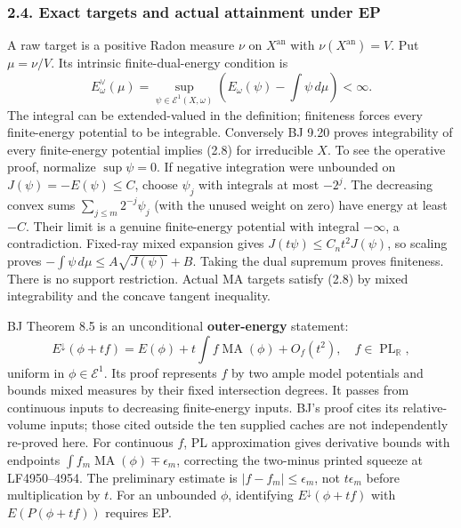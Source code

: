 \documentclass[
  10pt,
]{article}
\begin{document}
\subsubsection{2.4. Exact targets and actual attainment under
EP}\label{exact-targets-and-actual-attainment-under-ep}

A raw target is a positive Radon measure \(\nu\) on \(X^{\mathrm{an}}\)
with \(\nu(X^{\mathrm{an}})=V\). Put \(\mu=\nu/V\). Its intrinsic
finite-dual-energy condition is \[
 E_\omega^\vee(\mu)=\sup_{\psi\in\mathcal E^1(X,\omega)}
 \left(E_\omega(\psi)-\int\psi\,d\mu\right)<\infty. \tag{2.8}
\] The integral can be extended-valued in the definition; finiteness
forces every finite-energy potential to be integrable. Conversely BJ
9.20 proves integrability of every finite-energy potential implies (2.8)
for irreducible \(X\). To see the operative proof, normalize
\(\sup\psi=0\). If negative integration were unbounded on
\(J(\psi)=-E(\psi)\le C\), choose \(\psi_j\) with integrals at most
\(-2^j\). The decreasing convex sums \(\sum_{j\le m}2^{-j}\psi_j\) (with
the unused weight on zero) have energy at least \(-C\). Their limit is a
genuine finite-energy potential with integral \(-\infty\), a
contradiction. Fixed-ray mixed expansion gives
\(J(t\psi)\le C_n t^2J(\psi)\), so scaling proves
\(-\int\psi\,d\mu\le A\sqrt{J(\psi)}+B\). Taking the dual supremum
proves finiteness. There is no support restriction. Actual MA targets
satisfy (2.8) by mixed integrability and the concave tangent inequality.

BJ Theorem 8.5 is an unconditional \textbf{outer-energy} statement:
\[ E^\downarrow(\phi+tf)=E(\phi)+t\int f\operatorname{MA}(\phi)+O_f(t^2),
 \quad f\in\operatorname{PL}_{\mathbb R}, \tag{2.9}\] uniform in
\(\phi\in\mathcal E^1\). Its proof represents \(f\) by two ample model
potentials and bounds mixed measures by their fixed intersection
degrees. It passes from continuous inputs to decreasing finite-energy
inputs. BJ's proof cites its relative-volume inputs; those cited outside
the ten supplied caches are not independently re-proved here. For
continuous \(f\), PL approximation gives derivative bounds with
endpoints \(\int f_m\operatorname{MA}(\phi)\mp\epsilon_m\), correcting
the two-minus printed squeeze at LF4950--4954. The preliminary estimate
is \(|f-f_m|\le\epsilon_m\), not \(t\epsilon_m\) before multiplication
by \(t\). For an unbounded \(\phi\), identifying
\(E^\downarrow(\phi+tf)\) with \(E(P(\phi+tf))\) requires EP.
\end{document}

